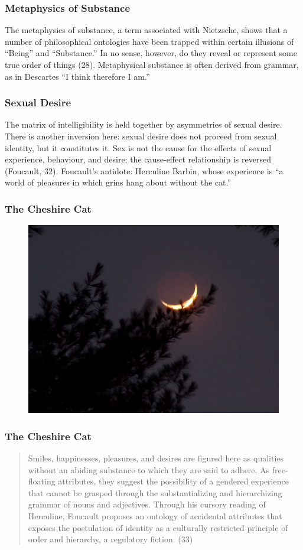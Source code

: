 \documentclass[xcolor=dvipsnames]{beamer}
\begin{document}
\begin{frame}
  \frametitle{Metaphysics of Substance}
The metaphysics of substance, a term associated with Nietzsche, shows
that a number of philosophical ontologies have been trapped within
certain illusions of ``Being'' and ``Substance.'' In no sense,
however, do they reveal or represent some true order of things (28).
Metaphysical substance is often derived from grammar, as in Descartes
``I think therefore I am.''  
\end{frame}

\begin{frame}
  \frametitle{Sexual Desire}
  The matrix of intelligibility is held together by asymmetries of
  sexual desire. There is another inversion here: sexual desire does
  not proceed from sexual identity, but it constitutes it. Sex is not
  the cause for the effects of sexual experience, behaviour, and
  desire; the cause-effect relationship is reversed (Foucault, 32).
  Foucault's antidote: Herculine Barbin, whose experience is ``a world
  of pleasures in which grins hang about without the cat.''
\end{frame}

\begin{frame}
  \frametitle{The Cheshire Cat}
  \begin{figure}[h]
    \includegraphics[scale=0.45]{./cheshire.jpg}
  \end{figure}
\end{frame}

\begin{frame}
  \frametitle{The Cheshire Cat}
  \begin{quote}
    Smiles, happinesses, pleasures, and desires are figured here as
    qualities without an abiding substance to which they are said to
    adhere. As free-floating attributes, they suggest the possibility
    of a gendered experience that cannot be grasped through the
    substantializing and hierarchizing grammar of nouns and
    adjectives. Through his cursory reading of Herculine, Foucault
    proposes an ontology of accidental attributes that exposes the
    postulation of identity as a culturally restricted principle of
    order and hierarchy, a regulatory fiction. (33)
  \end{quote}
\end{frame}
\end{document}

